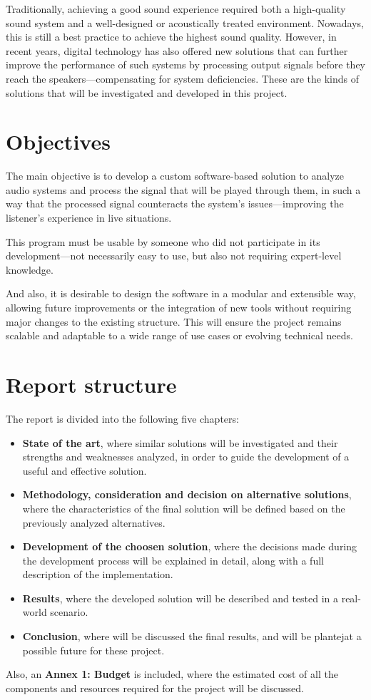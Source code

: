 Traditionally, achieving a good sound experience required both a high-quality sound system and a well-designed or acoustically treated environment. Nowadays, this is still a best practice to achieve the highest sound quality. However, in recent years, digital technology has also offered new solutions that can further improve the performance of such systems by processing output signals before they reach the speakers—compensating for system deficiencies. These are the kinds of solutions that will be investigated and developed in this project.


\section{Objectives}

The main objective is to develop a custom software-based solution to analyze audio systems and process the signal that will be played through them, in such a way that the processed signal counteracts the system’s issues—improving the listener’s experience in live situations.

This program must be usable by someone who did not participate in its development—not necessarily easy to use, but also not requiring expert-level knowledge.

And also, it is desirable to design the software in a modular and extensible way, allowing future improvements or the integration of new tools without requiring major changes to the existing structure. This will ensure the project remains scalable and adaptable to a wide range of use cases or evolving technical needs.

\section{Report structure}

The report is divided into the following five chapters:

\begin{itemize}
	\item \textbf{State of the art}, where similar solutions will be investigated and their strengths and weaknesses analyzed, in order to guide the development of a useful and effective solution.
	
	\item \textbf{Methodology, consideration and decision on alternative solutions}, where the characteristics of the final solution will be defined based on the previously analyzed alternatives.
	
	\item \textbf{Development of the choosen solution}, where the decisions made during the development process will be explained in detail, along with a full description of the implementation.
	
	\item \textbf{Results}, where the developed solution will be described and tested in a real-world scenario.
	
	\item \textbf{Conclusion}, where will be discussed the final results, and will be plantejat a possible future for these project.
\end{itemize}

Also, an \textbf{Annex 1: Budget} is included, where the estimated cost of all the components and resources required for the project will be discussed.

